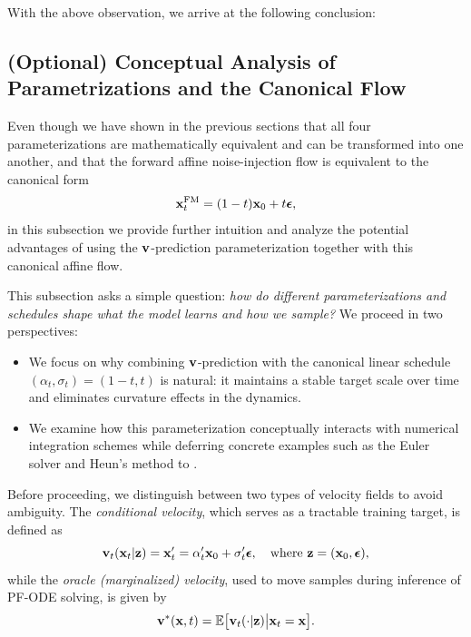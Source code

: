 With the above observation, we arrive at the following conclusion:


\subsection{(Optional) Conceptual Analysis of Parametrizations and the Canonical Flow}\label{subsec:concept-why-v-affine}
Even though we have shown in the previous sections that all four parameterizations are mathematically equivalent and can be transformed into one another, and that the forward affine noise-injection flow is equivalent to the canonical form
\[
{\mathbf{x}}_t^{\mathrm{FM}} = (1-t) {\mathbf{x}}_0 + t {\bm{\epsilon}},
\]
in this subsection we provide further intuition and analyze the potential advantages of using the ${\mathbf{v}}$-prediction parameterization together with this canonical affine flow.


This subsection asks a simple question: \emph{how do different parameterizations and schedules shape what the model learns and how we sample?} We proceed in two perspectives:
\begin{itemize}
  \item {} We focus on why combining ${\mathbf{v}}$-prediction with the canonical linear schedule $(\alpha_t,\sigma_t)=(1-t,t)$ is natural: it maintains a stable target scale over time and eliminates curvature effects in the dynamics.
  \item {} We examine how this parameterization conceptually interacts with numerical integration schemes while deferring concrete examples such as the Euler solver and Heun’s method to .
\end{itemize}

Before proceeding, we distinguish between two types of velocity fields to avoid ambiguity. The \emph{conditional velocity}, which serves as a tractable training target, is defined as
\[
{\mathbf{v}}_t({\mathbf{x}}_t |{\mathbf{z}}) = {\mathbf{x}}_t' = \alpha_t' {\mathbf{x}}_0 + \sigma_t' {\bm{\epsilon}}, 
\quad \text{where } {\mathbf{z}} = ({\mathbf{x}}_0, {\bm{\epsilon}}),
\]
while the \emph{oracle (marginalized) velocity}, used to move samples during inference of PF-ODE solving, is given by
\[
{\mathbf{v}}^*({\mathbf{x}}, t) = \mathbb{E}\big[{\mathbf{v}}_t(\cdot |{\mathbf{z}})  \big|  {\mathbf{x}}_t = {\mathbf{x}}\big].
\]

